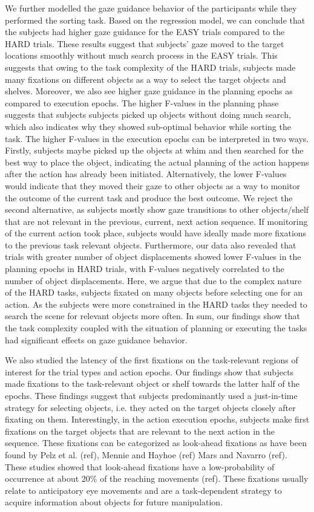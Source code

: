 We further modelled the gaze guidance behavior of the participants while they performed the sorting task. Based on the regression model, we can conclude that the subjects had higher gaze guidance for the EASY trials compared to the HARD trials. These results suggest that subjects' gaze moved to the target locations smoothly without much search process in the EASY trials. This suggests that owing to the task complexity of the HARD trials, subjects made many fixations on different objects as a way to select the target objects and shelves. Moreover, we also see higher gaze guidance in the planning epochs as compared to execution epochs. The higher F-values in the planning phase suggests that subjects subjects picked up objects without doing much search, which also indicates why they showed sub-optimal behavior while sorting the task. The higher F-values in the execution epochs can be interpreted in two ways. Firstly, subjects maybe picked up the objects at whim and then searched for the best way to place the object, indicating the actual planning of the action happens  after the action has already been initiated. Alternatively, the lower F-values would indicate that they moved their gaze to other objects as a way to monitor the outcome of the current task and produce the best outcome. We reject the second alternative, as subjects mostly show gaze transitions to other objects/shelf that are not relevant in the previous, current, next action sequence. If monitoring of the current action took place, subjects would have ideally made more fixations to the previous task relevant objects. Furthermore, our data also revealed that trials with greater number of object displacements showed lower F-values in the planning epochs in HARD trials, with F-values negatively correlated to the number of object displacements. Here, we argue that due to the complex nature of the HARD tasks, subjects fixated on many objects before selecting one for an action. As the subjects were more constrained in the HARD tasks they needed to search the scene for relevant objects more often. In sum, our findings show that the task complexity coupled with the situation of planning or executing the tasks had significant effects on gaze guidance behavior. 

We also studied the latency of the first fixations on the task-relevant regions of interest for the trial types and action epochs. Our findings show that subjects made fixations to the task-relevant object or shelf towards the latter half of the epochs. These findings suggest that subjects predominantly used a just-in-time strategy for selecting objects, i.e. they acted on the target objects closely after fixating on them. Interestingly, in the action execution epochs, subjects make first fixations on the target objects that are relevant to the next action in the sequence. These fixations can be categorized as look-ahead fixations as have been found by Pelz et al. (ref), Mennie and Hayhoe (ref) Mars and Navarro (ref). These studies showed that look-ahead fixations have a low-probability of occurrence at about 20\% of the reaching movements (ref). These fixations usually relate to anticipatory eye movements and are a task-dependent strategy to acquire information about objects for future manipulation.

